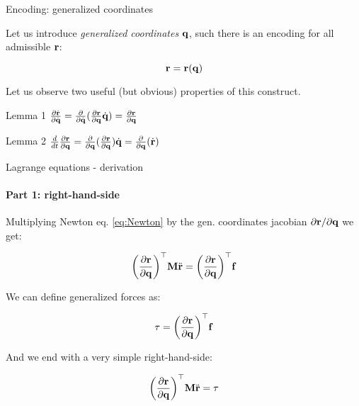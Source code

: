 \documentclass{beamer}
\begin{document}
\begin{frame}{Encoding: generalized coordinates}
\begin{flushleft}

Let us introduce \emph{generalized coordinates} $\mathbf{q}$, such there is an encoding for all admissible $\mathbf{r}$:

\begin{equation}
    \mathbf{r} = \mathbf{r} (\mathbf{q})
\end{equation}

Let us observe two useful (but obvious) properties of this construct.

\begin{block}{Lemma 1}
$\frac{\partial \dot{\mathbf{r}}}{\partial \dot{\mathbf{q}}} = 
\frac{\partial}{\partial \dot{\mathbf{q}}} ( \frac{\partial \mathbf{r}}{\partial \mathbf{q}}\dot{\mathbf{q}} ) =
\frac{\partial \mathbf{r}}{\partial \mathbf{q}}$
\end{block}


\begin{block}{Lemma 2}
$\frac{d}{dt} \frac{\partial \mathbf{r}}{\partial \mathbf{q}} = 
\frac{\partial}{\partial \mathbf{q}} (\frac{\partial \mathbf{r}}{\partial \mathbf{q}}) \dot{\mathbf{q}} =
\frac{\partial }{\partial \mathbf{q}} (\dot{\mathbf{r}})$
\end{block}

\end{flushleft}
\end{frame}




\begin{frame}{Lagrange equations - derivation}
\framesubtitle{Part 1: right-hand-side}
\begin{flushleft}

Multiplying Newton eq. \eqref{eq:Newton} by the gen. coordinates jacobian $\partial \mathbf{r} / \partial \mathbf{q}$ we get:

\begin{equation}
    \bigg( \frac{\partial \mathbf{r}}{\partial \mathbf{q}} \bigg) ^\top 
    \mathbf{M} \ddot{\mathbf{r}} = 
    \bigg( \frac{\partial \mathbf{r}}{\partial \mathbf{q}} \bigg) ^\top 
    \mathbf{f}
\end{equation}

We can define generalized forces as:

\begin{equation}
    \tau = \bigg( \frac{\partial \mathbf{r}}{\partial \mathbf{q}} \bigg) ^\top \mathbf{f}
\end{equation}

And we end with a very simple right-hand-side:

\begin{equation}
    \bigg( \frac{\partial \mathbf{r}}{\partial \mathbf{q}} \bigg) ^\top 
    \mathbf{M} \ddot{\mathbf{r}} = 
    \tau
\end{equation}


\end{flushleft}
\end{frame}
\end{document}
